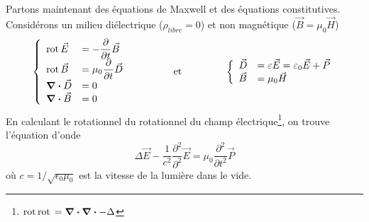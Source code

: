 	
Partons maintenant des équations de Maxwell et des équations constitutives. Considérons 
	un milieu diélectrique ($\rho_{libre}=0$) et non magnétique ($\vec{B}=\mu_0\vec{H}$)
	\begin{equation}
	\left\{\begin{array}{ll}
	\text{rot}\,\vec{E} &\displaystyle= -\frac{\partial}{\partial t}\vec{B}\\
	\text{rot}\,\vec{B} &\displaystyle=\mu_0\dfrac{\partial}{\partial t}\vec{D}\\
	\div\vec{D}&=\displaystyle 0\\
	\div\vec{B}&=\displaystyle 0
	\end{array}\right.\qquad\qquad\text{ et }\qquad\qquad\left\{\begin{array}{ll}
	\vec{D} &=\displaystyle \varepsilon\vec{E} = \varepsilon_0\vec{E}+\vec{P}\\
	\vec{B}&=\displaystyle \mu_0\vec{H}
	\end{array}\right.
	\end{equation}
	En calculant le rotationnel du rotationnel du champ électrique\footnote{$\text{rot}\,\text{rot}\, = \div\div - \Delta$}, 
	on trouve l'équation d'onde
	\begin{equation}
	\Delta\vec{E}-\frac{1}{c^2}\dfrac{\partial^2}{\partial^2}\vec{E}=\mu_0\dfrac{\partial^2}{\partial t^2}\vec{P}
	\end{equation}
	où $c = 1/\sqrt{\epsilon_0\mu_0}$ est la vitesse de la lumière dans le vide. \\
	
